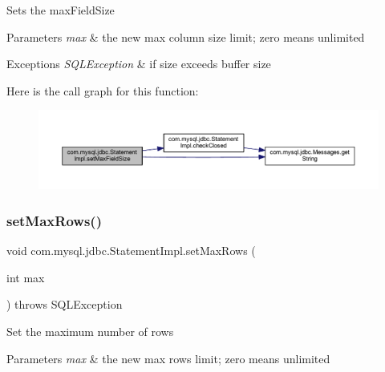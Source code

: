 Sets the max\+Field\+Size


\begin{DoxyParams}{Parameters}
{\em max} & the new max column size limit; zero means unlimited\\
\hline
\end{DoxyParams}

\begin{DoxyExceptions}{Exceptions}
{\em S\+Q\+L\+Exception} & if size exceeds buffer size \\
\hline
\end{DoxyExceptions}
Here is the call graph for this function\+:
\nopagebreak
\begin{figure}[H]
\begin{center}
\leavevmode
\includegraphics[width=350pt]{classcom_1_1mysql_1_1jdbc_1_1_statement_impl_a21c0da8a415543b37cf396f85ba77ef8_cgraph}
\end{center}
\end{figure}
\mbox{\label{classcom_1_1mysql_1_1jdbc_1_1_statement_impl_a06eb1d241e4ca066606cbf1a1e04e87c}} 
\subsubsection{\texorpdfstring{set\+Max\+Rows()}{setMaxRows()}}
{\footnotesize\ttfamily void com.\+mysql.\+jdbc.\+Statement\+Impl.\+set\+Max\+Rows (\begin{DoxyParamCaption}\item[{int}]{max }\end{DoxyParamCaption}) throws S\+Q\+L\+Exception}

Set the maximum number of rows


\begin{DoxyParams}{Parameters}
{\em max} & the new max rows limit; zero means unlimited\\
\hline
\end{DoxyParams}

